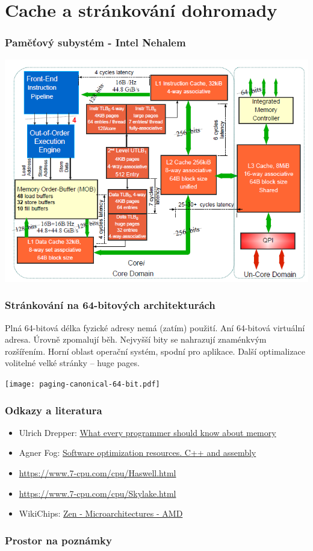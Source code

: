 \documentclass{beamer}
\begin{document}
\section{Cache a stránkování dohromady}

\begin{frame}
\frametitle{Paměťový subystém - Intel Nehalem}

{
\centering

\includegraphics[width=0.80\linewidth]{fig/mem-nehalem-lat.png}

}

\end{frame}

\begin{frame}
\frametitle{Stránkování na 64-bitových architekturách}

Plná 64-bitová délka fyzické adresy nemá (zatím) použití.
Aní 64-bitová virtuální adresa. Úrovně zpomalují běh.
Nejvyšší bity se nahrazují znaménkvým rozšířením.
Horní oblast operační systém, spodní pro aplikace.
Další optimalizace volitelné velké stránky -- huge pages.

{
\centering

\texttt{[image: paging-canonical-64-bit.pdf]}

}
\end{frame}

\begin{frame}
\frametitle{Odkazy a literatura}

\begin{itemize}
\item Ulrich Drepper: \href{https://lwn.net/Articles/250967/}{What every programmer should know about memory}
\item Agner Fog: \href{https://www.agner.org/optimize/}{Software optimization resources. C++ and assembly}
\item \url{https://www.7-cpu.com/cpu/Haswell.html}
\item \url{https://www.7-cpu.com/cpu/Skylake.html}
\item WikiChips: \href{https://en.wikichip.org/wiki/amd/microarchitectures/zen}{Zen - Microarchitectures - AMD}

\end{itemize}

\end{frame}

\begin{frame}
\frametitle{Prostor na poznámky}

\end{frame}
\end{document}
